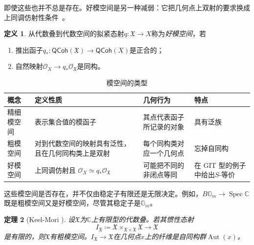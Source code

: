 \documentclass{amsart}
\newtheorem{thm}{定理}[section]
\theoremstyle{definition}
\newtheorem{defn}[thm]{定义}
\theoremstyle{remark}
\theoremstyle{plain}
\theoremstyle{definition}
\theoremstyle{remark}
\newcommand{\G}{\mathbb{G}}
\newcommand{\C}{\mathbb{C}}
\newcommand{\mc}[1]{\mathcal{#1}}
\newcommand{\mf}[1]{\mathfrak{#1}}
\newcommand{\on}[1]{\operatorname{#1}}
\newcommand{\ms}[1]{\mathsf{#1}}
\newcommand{\1}{\mathbf{1}}
\newcommand{\2}{\mathbf{2}}
\newcommand{\3}{\mathbf{3}}
\begin{document}
即使这些也并不总是存在。好模空间是另一种减弱：它把几何点上双射的要求换成上同调仿射性条件~\cite{Alper2013}。

\begin{defn}
    从代数叠到代数空间的拟紧态射\(q\colon\mf{X}\to X\)称为\textit{好模空间}，若
    \begin{enumerate}
        \item 推出函子\(q_*\colon\ms{QCoh}(\mf{X})\to\ms{QCoh}(X)\)是正合的；
        \item 自然映射\(\mc{O}_X\to q_*\mc{O}_{\mf{X}}\)是同构。
    \end{enumerate}
\end{defn}

\begin{table}[htpb]
    \centering
    \caption{模空间的类型}
    \label{tab:moduli-types-corrected}
    \renewcommand{\arraystretch}{1.3}
    \begin{tabular}{
        p{}
        p{}
        p{}
        p{}
    }
        \toprule
        \textbf{概念}
        & \textbf{定义性质}
        & \textbf{几何行为}
        & \textbf{特点}
        \\
        \midrule
        精细模空间
        & 表示集合值的模函子
        & 其点代表函子所记录的对象
        & 具有泛族
        \\
        粗模空间
        & 对到代数空间的映射具有泛性，且在几何同构类上是双射
        & 每个同构类对应一个几何点
        & 忘掉自同构
        \\
        好模空间
        & 上同调仿射且
          \(\mc{O}_X \simeq q_*\mc{O}_{\mf{X}}\)
        & 可能把不同的非闭点等同
        & 在 GIT 型的例子中给出\(S\)-等价
        \\
        \bottomrule
    \end{tabular}
\end{table}

这些模空间是否存在，并不仅由稳定子有限还是无限决定。例如，\(B\G_m\to\on{Spec}\C\)既是粗模空间又是好模空间，尽管其稳定子是\(\G_m\)。

\begin{thm}[Keel-Mori {\cite{KeelMori1997}}]
    设\(\mf{X}\)为\(\C\)上有限型的代数叠。若其惯性态射
    \[
        I_{\mf{X}}
        \coloneqq
        \mf{X}\times_{\mf{X}\times\mf{X}}\mf{X}
        \longrightarrow \mf{X}
    \]
    是有限的，则\(\mf{X}\)有粗模空间。\(I_{\mf{X}}\to\mf{X}\)在几何点\(x\)上的纤维是自同构群\(\on{Aut}(x)\)。
\end{thm}
\end{document}
